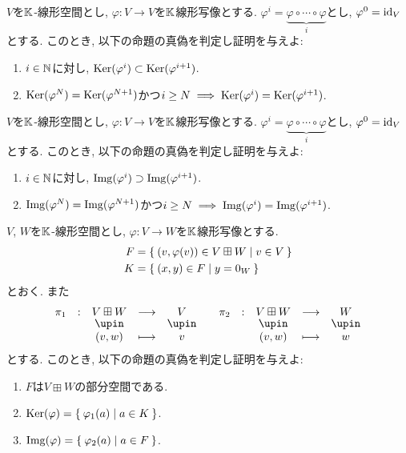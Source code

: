\begin{quiz}
  $V$を$\mathbb{K}$-線形空間とし,
  $\varphi\colon V\to V$を$\mathbb{K}$線形写像とする.
  $\varphi^{i}=\underbrace{\varphi\circ\cdots\circ\varphi}_{i}$とし,
  $\varphi^{0}=\operatorname{id}_V$とする.
  このとき,
  以下の命題の真偽を判定し証明を与えよ:
  \begin{enumerate}
    \item $i\in\mathbb{N}$に対し, $\operatorname{Ker}(\varphi^i)\subset \operatorname{Ker}(\varphi^{i+1})$.
    \item $\operatorname{Ker}(\varphi^N) =\operatorname{Ker}(\varphi^{N+1})$かつ$i\geq N\implies \operatorname{Ker}(\varphi^i) =\operatorname{Ker}(\varphi^{i+1})$.
  \end{enumerate}
\end{quiz}

\begin{quiz}
  $V$を$\mathbb{K}$-線形空間とし,
  $\varphi\colon V\to V$を$\mathbb{K}$線形写像とする.
  $\varphi^{i}=\underbrace{\varphi\circ\cdots\circ\varphi}_{i}$とし,
  $\varphi^{0}=\operatorname{id}_V$とする.
  このとき,
  以下の命題の真偽を判定し証明を与えよ:
  \begin{enumerate}
    \item $i\in\mathbb{N}$に対し, $\operatorname{Img}(\varphi^i)\supset \operatorname{Img}(\varphi^{i+1})$.
    \item $\operatorname{Img}(\varphi^N) =\operatorname{Img}(\varphi^{N+1})$かつ$i\geq N\implies \operatorname{Img}(\varphi^i) =\operatorname{Img}(\varphi^{i+1})$.
  \end{enumerate}
\end{quiz}


\begin{quiz}
  $V$, $W$を$\mathbb{K}$-線形空間とし,
  $\varphi\colon V\to W$を$\mathbb{K}$線形写像とする.
  \begin{align*}
    F&=\Set{(v,\varphi(v))\in V\boxplus W| v\in V }\\
    K&=\Set{(x,y) \in F | y=0_W}
  \end{align*}
  とおく.
  また
  \begin{align*}
    \shazo{\pi_1}{V\boxplus W}{V}
          {(v,w)}{v}
          &&
    \shazo{\pi_2}{V\boxplus W}{W}
          {(v,w)}{w}
  \end{align*}
  とする.
  このとき,
  以下の命題の真偽を判定し証明を与えよ:
  \begin{enumerate}
  \item
    $F$は$V\boxplus W$の部分空間である.
  \item
    $\operatorname{Ker}(\varphi)=\Set{\varphi_1(a) | a\in K}$.
  \item
    $\operatorname{Img}(\varphi)=\Set{\varphi_2(a) | a\in F}$.
  \end{enumerate}
\end{quiz}

